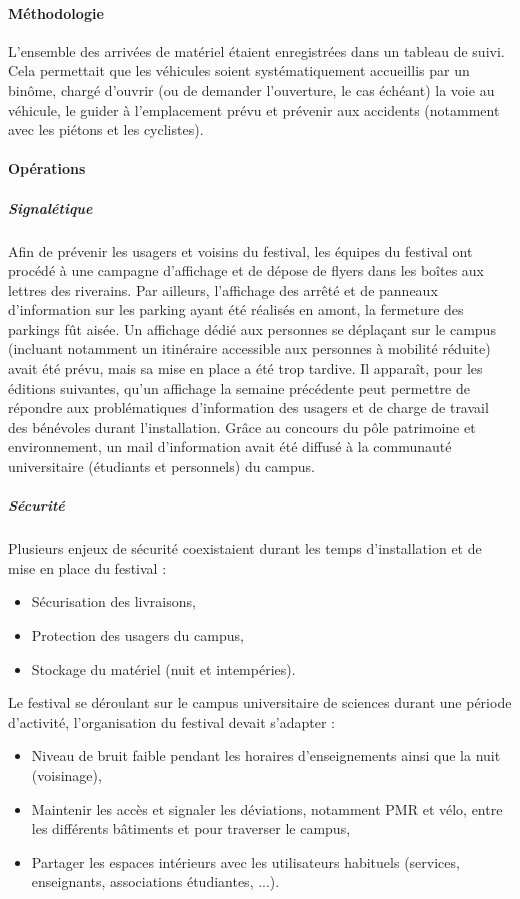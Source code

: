 \documentclass[12pt,a4paper]{report}
\begin{document}
\paragraph{Méthodologie}

L'ensemble des arrivées de matériel étaient enregistrées dans un tableau de suivi. Cela permettait que les véhicules soient systématiquement accueillis par un binôme, chargé d'ouvrir (ou de demander l'ouverture, le cas échéant) la voie au véhicule, le guider à l'emplacement prévu et prévenir aux accidents (notamment avec les piétons et les cyclistes).

\paragraph{Opérations}

\subparagraph{Signalétique}

Afin de prévenir les usagers et voisins du festival, les équipes du festival ont procédé à une campagne d'affichage et de dépose de flyers dans les boîtes aux lettres des riverains. Par ailleurs, l'affichage des arrêté et de panneaux d'information sur les parking ayant été réalisés en amont, la fermeture des parkings fût aisée. Un affichage dédié aux personnes se déplaçant sur le campus (incluant notamment un itinéraire accessible aux personnes à mobilité réduite) avait été prévu, mais sa mise en place a été trop tardive. Il apparaît, pour les éditions suivantes, qu'un affichage la semaine précédente peut permettre de répondre aux problématiques d'information des usagers et de charge de travail des bénévoles durant l'installation. Grâce au concours du pôle patrimoine et environnement, un mail d'information avait été diffusé à la communauté universitaire (étudiants et personnels) du campus.

\subparagraph{Sécurité}

Plusieurs enjeux de sécurité coexistaient durant les temps d'installation et de mise en place du festival : 
\begin{itemize}
\item Sécurisation des livraisons,
\item Protection des usagers du campus,
\item Stockage du matériel (nuit et intempéries).\\
\end{itemize}

Le festival se déroulant sur le campus universitaire de sciences durant une période d'activité, l'organisation du festival devait s'adapter : 
\begin{itemize}
\item Niveau de bruit faible pendant les horaires d'enseignements ainsi que la nuit (voisinage),
\item Maintenir les accès et signaler les déviations, notamment PMR et vélo, entre les différents bâtiments et pour traverser le campus,
\item Partager les espaces intérieurs avec les utilisateurs habituels (services, enseignants, associations étudiantes, ...).\\
\end{itemize}
\end{document}
